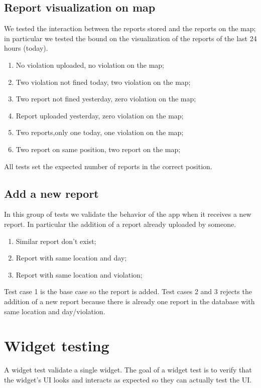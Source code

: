 \documentclass[../ITD.tex]{subfiles}
\begin{document}
    \subsection{Report visualization on map}\label{subsec:report-visualization-on-map}
    We tested the interaction between the reports stored and the reports on the map; in particular we tested the bound on the visualization of the reports of the last 24 hours (today).
    \begin{enumerate}
        \item No violation uploaded, no violation on the map;
        \item Two violation not fined today, two violation on the map;
        \item Two report not fined yesterday, zero violation on the map;
        \item Report uploaded yesterday, zero violation on the map;
        \item Two reports,only one today, one violation on the map;
        \item Two report on same position, two report on the map;
    \end{enumerate}
    All tests set the expected number of reports in the correct position.

    \subsection{Add a new report}\label{subsec:add-a-new-report}
    In this group of tests we validate the behavior of the app when it receives a new report.
    In particular the addition of a report already uploaded by someone.
    \begin{enumerate}
        \item Similar report don't exist;
        \item Report with same location and day;
        \item Report with same location and violation;
    \end{enumerate}
    Test case 1 is the base case so the report is added.
    \newline Test cases 2 and 3 rejects the addition of a new report because there is already one report in the database with same location and day/violation.


    \section{Widget testing}\label{sec:widget-testing}
    A widget test validate a single widget.
    The goal of a widget test is to verify that the widget’s UI looks and interacts as expected so they can actually test the UI.
\end{document}
